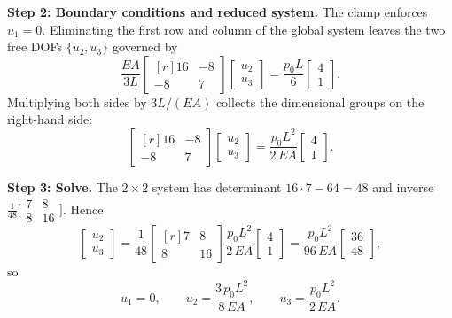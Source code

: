 \begin{example}
\medskip
\noindent\textbf{Step 2: Boundary conditions and reduced system.}
The clamp enforces $u_1 = 0$. Eliminating the first row and column of
the global system leaves the two free DOFs $\{u_2, u_3\}$ governed by
\begin{equation*}
    \frac{EA}{3L}
    \begin{bmatrix*}[r] 16 & -8 \\ -8 & 7 \end{bmatrix*}
    \begin{bmatrix} u_2 \\ u_3 \end{bmatrix}
    = \frac{p_0 L}{6}\begin{bmatrix} 4 \\ 1 \end{bmatrix} .
\end{equation*}
Multiplying both sides by $3L/(EA)$ collects the dimensional groups on
the right-hand side:
\begin{equation*}
    \begin{bmatrix*}[r] 16 & -8 \\ -8 & 7 \end{bmatrix*}
    \begin{bmatrix} u_2 \\ u_3 \end{bmatrix}
    = \frac{p_0 L^2}{2\,EA}\!\begin{bmatrix} 4 \\ 1 \end{bmatrix} .
\end{equation*}

\medskip
\noindent\textbf{Step 3: Solve.}
The $2\times2$ system has determinant $16\cdot 7 - 64 = 48$ and inverse
$\tfrac{1}{48}\bigl[\begin{smallmatrix} 7 & 8 \\ 8 & 16 \end{smallmatrix}\bigr]$.
Hence
\begin{equation*}
    \begin{bmatrix} u_2 \\ u_3 \end{bmatrix}
    = \frac{1}{48}\!
      \begin{bmatrix*}[r] 7 & 8 \\ 8 & 16 \end{bmatrix*}
      \frac{p_0 L^2}{2\,EA}\!\begin{bmatrix} 4 \\ 1 \end{bmatrix}
    = \frac{p_0 L^2}{96\,EA}\!\begin{bmatrix} 36 \\ 48 \end{bmatrix} ,
\end{equation*}
so
\begin{equation}
    u_1 = 0, \qquad
    u_2 = \frac{3\,p_0 L^2}{8\,EA}, \qquad
    u_3 = \frac{p_0 L^2}{2\,EA} .
    \label{eq:ex_bar_quad_disp}
\end{equation}


\end{example}
